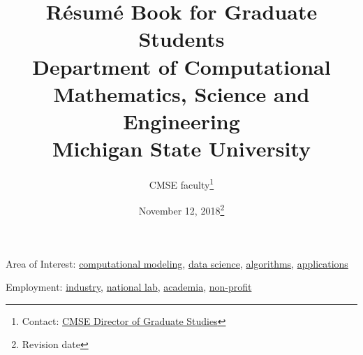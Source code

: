 \documentclass[11pt]{article}
\begin{document}
\vspace{-50mm}
\title{R\'esum\'e Book for Graduate Students\\
\vspace{20mm}
  \large Department of Computational Mathematics, Science and
  Engineering\\
\vspace{20mm}
Michigan State University
\vspace{50mm}
}

\author{CMSE faculty\footnote{Contact:
    \href{mailto:cmsegrad@msu.edu}{CMSE Director of Graduate Studies}
  }}

\date{November 12, 2018\footnote{Revision date}}

\maketitle

\newpage

\tableofcontents

\vspace{1em}

\noindent Area of Interest: \hyperlink{computational modeling}{computational modeling}, 
                            \hyperlink{data science}{data science}, 
                            \hyperlink{algorithms}{algorithms}, \hyperlink{applications}{applications}


\noindent Employment: \hyperlink{industry}{industry}, \hyperlink{national lab}{national lab},  
            \hyperlink{academia}{academia}, \hyperlink{non-profit}{non-profit}


\newpage



\newpage



\newpage



\newpage






% 


% 


% 
\end{document}
